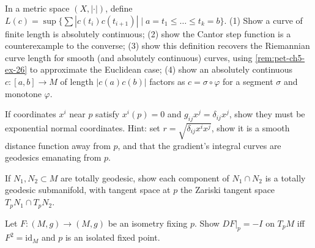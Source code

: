 \begin{remark}
  \label{rem:pet-ch5-ex-29}

  In a metric space $(X,|\cdot|)$, define
  $L(c)=\sup\{\sum|c(t_i)c(t_{i+1})|\mid a=t_1\le\dots\le t_k=b\}$. (1) Show a
  curve of finite length is absolutely continuous; (2) show the Cantor step
  function is a counterexample to the converse; (3) show this definition recovers
  the Riemannian curve length for smooth (and absolutely continuous) curves, using
  \cref{rem:pet-ch5-ex-26} to approximate the Euclidean case; (4) show an
  absolutely continuous $c:[a,b]\to M$ of length $|c(a)c(b)|$ factors as
  $c=\sigma\circ\varphi$ for a segment $\sigma$ and monotone $\varphi$.
\end{remark}

\begin{remark}
  \label{rem:pet-ch5-ex-30}

  If coordinates $x^i$ near $p$ satisfy $x^i(p)=0$ and $g_{ij}x^j=\delta_{ij}x^j$,
  show they must be exponential normal coordinates. Hint: set
  $r=\sqrt{\delta_{ij}x^ix^j}$, show it is a smooth distance function away from
  $p$, and that the gradient's integral curves are geodesics emanating from $p$.
\end{remark}

\begin{remark}
  \label{rem:pet-ch5-ex-31}

  If $N_1,N_2\subset M$ are totally geodesic, show each component of $N_1\cap N_2$
  is a totally geodesic submanifold, with tangent space at $p$ the Zariski tangent
  space $T_pN_1\cap T_pN_2$.
\end{remark}

\begin{remark}
  \label{rem:pet-ch5-ex-32}

  Let $F:(M,g)\to(M,g)$ be an isometry fixing $p$. Show $DF|_p=-I$ on $T_pM$ iff
  $F^2=\mathrm{id}_M$ and $p$ is an isolated fixed point.
\end{remark}

